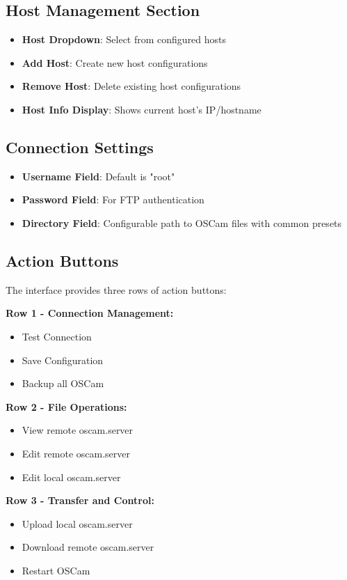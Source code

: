 \documentclass[a4paper,11pt]{report}
\begin{document}
\subsection{Host Management Section}
\begin{itemize}
    \item \textbf{Host Dropdown}: Select from configured hosts
    \item \textbf{Add Host}: Create new host configurations
    \item \textbf{Remove Host}: Delete existing host configurations
    \item \textbf{Host Info Display}: Shows current host's IP/hostname
\end{itemize}

\subsection{Connection Settings}
\begin{itemize}
    \item \textbf{Username Field}: Default is "root"
    \item \textbf{Password Field}: For FTP authentication
    \item \textbf{Directory Field}: Configurable path to OSCam files with common presets
\end{itemize}

\subsection{Action Buttons}
The interface provides three rows of action buttons:

\textbf{Row 1 - Connection Management:}
\begin{itemize}
    \item Test Connection
    \item Save Configuration
    \item Backup all OSCam
\end{itemize}

\textbf{Row 2 - File Operations:}
\begin{itemize}
    \item View remote oscam.server
    \item Edit remote oscam.server
    \item Edit local oscam.server
\end{itemize}

\textbf{Row 3 - Transfer and Control:}
\begin{itemize}
    \item Upload local oscam.server
    \item Download remote oscam.server
    \item Restart OSCam
\end{itemize}
\end{document}
